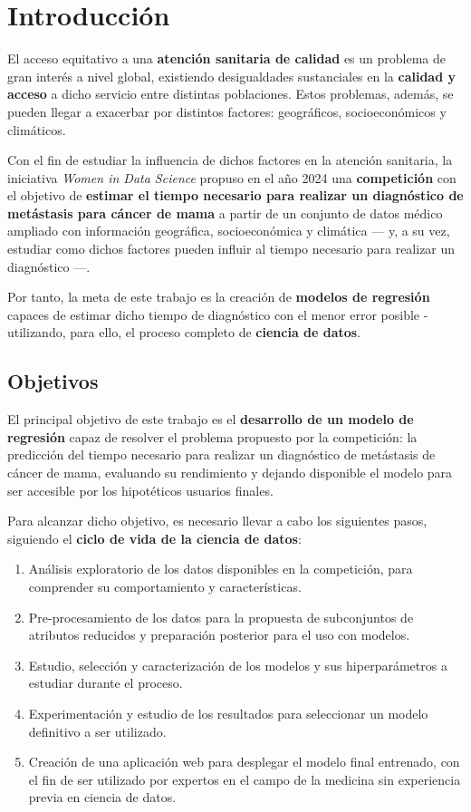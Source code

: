 \chapter{Introducción}

El acceso equitativo a una \textbf{atención sanitaria de calidad} es un problema de gran interés a nivel global, existiendo desigualdades sustanciales en la \textbf{calidad y acceso} a dicho servicio entre distintas poblaciones. Estos problemas, además, se pueden llegar a exacerbar por distintos factores: geográficos, socioeconómicos y climáticos.

Con el fin de estudiar la influencia de dichos factores en la atención sanitaria, la iniciativa \textit{Women in Data Science} propuso en el año 2024 una \textbf{competición} \cite{widsdatathon2024-challenge2} con el objetivo de \textbf{estimar el tiempo necesario para realizar un diagnóstico de metástasis para cáncer de mama} a partir de un conjunto de datos médico ampliado con información geográfica, socioeconómica y climática --- y, a su vez, estudiar como dichos factores pueden influir al tiempo necesario para realizar un diagnóstico ---.

Por tanto, la meta de este trabajo es la creación de \textbf{modelos de regresión} capaces de estimar dicho tiempo de diagnóstico con el menor error posible - utilizando, para ello, el proceso completo de \textbf{ciencia de datos}.

\section{Objetivos}

El principal objetivo de este trabajo es el \textbf{desarrollo de un modelo de regresión} capaz de resolver el problema propuesto por la competición: la predicción del tiempo necesario para realizar un diagnóstico de metástasis de cáncer de mama, evaluando su rendimiento y dejando disponible el modelo para ser accesible por los hipotéticos usuarios finales.

Para alcanzar dicho objetivo, es necesario llevar a cabo los siguientes pasos, siguiendo el \textbf{ciclo de vida de la ciencia de datos}:
\begin{enumerate}
	\item Análisis exploratorio de los datos disponibles en la competición, para comprender su comportamiento y características.
	\item Pre-procesamiento de los datos para la propuesta de subconjuntos de atributos reducidos y preparación posterior para el uso con modelos.
	\item Estudio, selección y caracterización de los modelos y sus hiperparámetros a estudiar durante el proceso.
	\item Experimentación y estudio de los resultados para seleccionar un modelo definitivo a ser utilizado.
	\item Creación de una aplicación web para desplegar el modelo final entrenado, con el fin de ser utilizado por expertos en el campo de la medicina sin experiencia previa en ciencia de datos.
\end{enumerate}

